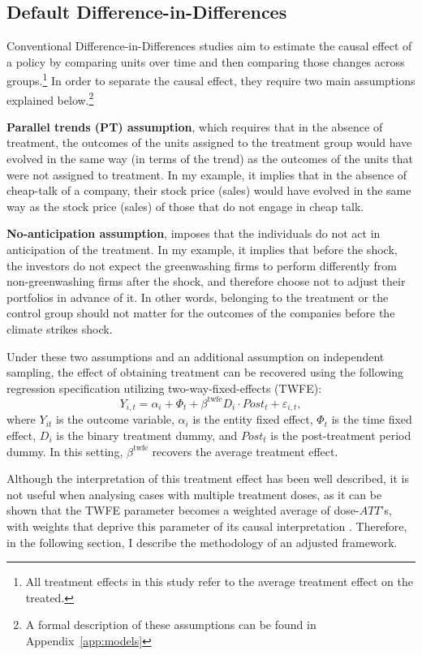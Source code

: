 \documentclass[12pt]{article}
\begin{document}
\subsection{Default Difference-in-Differences}

Conventional Difference-in-Differences studies aim to estimate the causal effect of a policy by comparing units over time and then comparing those changes across groups.\footnote{All treatment effects in this study refer to the average treatment effect on the treated.} In order to separate the causal effect, they require two main assumptions explained below.\footnote{A formal description of these assumptions can be found in Appendix~\ref{app:models}} 

\textbf{Parallel trends (PT) assumption}, which requires that in the absence of treatment, the outcomes of the units assigned to the treatment group would have evolved in the same way (in terms of the trend) as the outcomes of the units that were not assigned to treatment. In my example, it implies that in the absence of cheap-talk of a company, their stock price (sales) would have evolved in the same way as the stock price (sales) of those that do not engage in cheap talk. 

\textbf{No-anticipation assumption}, imposes that the individuals do not act in anticipation of the treatment. In my example, it implies that before the shock, the investors do not expect the greenwashing firms to perform differently from non-greenwashing firms after the shock, and therefore choose not to adjust their portfolios in advance of it. In other words, belonging to the treatment or the control group should not matter for the outcomes of the companies before the climate strikes shock.

Under these two assumptions and an additional assumption on independent sampling, the effect of obtaining treatment can be recovered using the following regression specification utilizing two-way-fixed-effects (TWFE):
\begin{equation}
    Y_{i,t} = \alpha_i + \Phi_t + \beta^{\text{twfe}} D_{i} \cdot Post_{t} + \varepsilon_{i,t},
\end{equation}
where $Y_{it}$ is the outcome variable, $\alpha_i$ is the entity fixed effect, $\Phi_t$ is the time fixed effect, $D_i$ is the binary treatment dummy, and $Post_t$ is the post-treatment period dummy. In this setting, $\beta^{\text{twfe}}$ recovers the average treatment effect.

Although the interpretation of this treatment effect has been well described, it is not useful when analysing cases with multiple treatment doses, as it can be shown that the TWFE parameter becomes a weighted average of dose-$ATT$'s, with weights that deprive this parameter of its causal interpretation \parencite{callawayDifferenceinDifferencesContinuousTreatment2025}. Therefore, in the following section, I describe the methodology of an adjusted framework.
\end{document}
